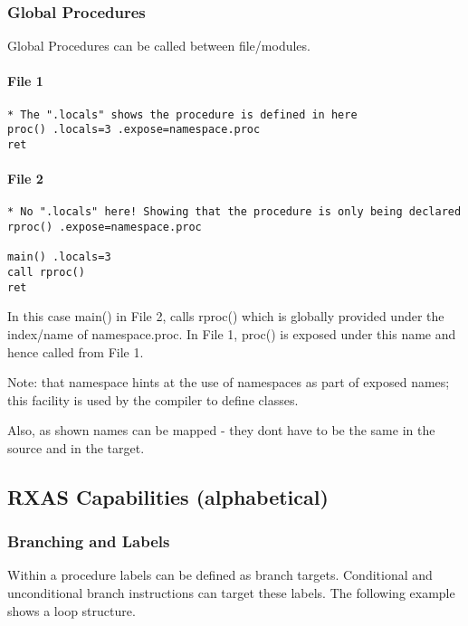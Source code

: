 \subsubsection{Global Procedures}

Global Procedures can be called between file/modules.

\paragraph{File 1}

\begin{verbatim}
* The ".locals" shows the procedure is defined in here
proc() .locals=3 .expose=namespace.proc
ret
\end{verbatim}

\paragraph{File 2}

\begin{verbatim}
* No ".locals" here! Showing that the procedure is only being declared 
rproc() .expose=namespace.proc

main() .locals=3 
call rproc()
ret
\end{verbatim}

In this case main() in File 2, calls rproc() which is globally provided
under the index/name of \textquotedbl{}namespace.proc\textquotedbl{}. In File 1, proc() is exposed under
this name and hence called from File 1.

Note: that \textquotedbl{}namespace\textquotedbl{} hints at the use of namespaces as part of exposed names; this facility is used by the compiler to define classes.

Also, as shown names can be mapped - they don\textquotesingle{}t have to be the same in the source
and in the target.

\subsection{RXAS Capabilities (alphabetical)}

\subsubsection{Branching and Labels}

Within a procedure labels can be defined as branch targets. Conditional and unconditional branch instructions can target these labels. The following example shows a loop structure.

